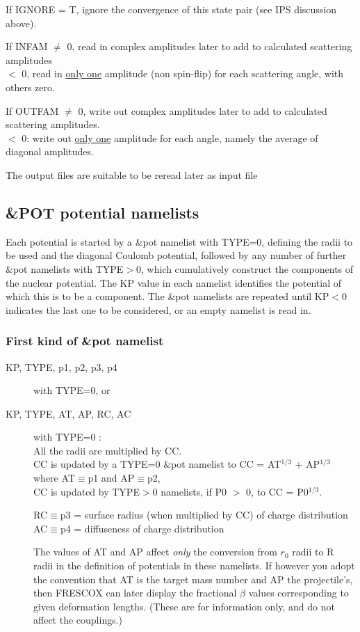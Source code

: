 \documentclass[11pt]{article}
\begin{document}
\begin{description}
If IGNORE = T, ignore the convergence of this  state pair
(see IPS discussion above).

If INFAM $\ne$ 0,  read in complex amplitudes later to add to
calculated scattering amplitudes\\
$<$ 0, read in \underline{only one} amplitude (non spin-flip)
for each scattering angle, with others zero.

If OUTFAM $\ne$ 0,  write out complex amplitudes later to add to
calculated scattering amplitudes.\\
$<$ 0: write out \underline{only one} amplitude 
for each  angle, namely the average of diagonal amplitudes.


The output files are suitable to be reread later as input file
\end{description}

\newpage
\subsection{\&POT potential namelists}
%
Each potential is started by a \&pot namelist with TYPE=0, defining the radii to be used
and the diagonal Coulomb potential, followed by any number of further \&pot namelists with TYPE$>$0,
which cumulatively construct the components of the nuclear potential.
The KP value in each namelist identifies the potential of which this is to be a component.
The \&pot namelists are repeated until KP$<0$ indicates the last one to be considered, or an empty namelist is read in.


\subsubsection{First kind of \&pot namelist}

\begin{description}
\item[KP, TYPE,  p1, p2, p3, p4]  with TYPE=0, or 
\item[KP, TYPE,  AT, AP,  RC, AC] with TYPE=0 : \\
%
    All the radii are multiplied by CC. \\
       CC is updated by a TYPE=0 \&pot namelist to CC = AT$^{1/3}$ + AP$^{1/3}$ where AT$\equiv$p1 and AP$\equiv$p2, \\
       CC is updated by TYPE$>$0 namelists, if P0 $>$ 0,  to CC = P0$^{1/3}$.

RC$\equiv$p3 = surface radius (when multiplied by CC) of charge distribution\\
AC$\equiv$p4  = diffuseness of charge distribution



The values of AT and AP affect {\em only} the conversion from $r_0$ radii
to R radii in the definition of potentials in these namelists.
If however you adopt the convention that AT is the target mass number
and AP the projectile's, then FRESCOX can later display the
fractional $\beta$ values corresponding to given deformation lengths.
(These are for information only, and do not affect the couplings.)


\end{description}
\end{document}
